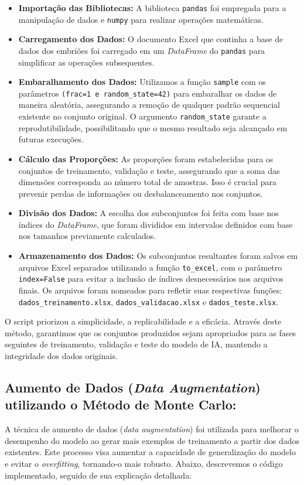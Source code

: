 \begin{itemize}
  \item \textbf{Importação das Bibliotecas:} A biblioteca \texttt{pandas} foi empregada para a manipulação de dados e \texttt{numpy} para realizar operações matemáticas.

  \item \textbf{Carregamento dos Dados:} O documento Excel que continha a base de dados dos embriões foi carregado em um \textit{DataFrame} do \texttt{pandas} para simplificar as operações subsequentes.

  \item \textbf{Embaralhamento dos Dados:} Utilizamos a função \texttt{sample} com os parâmetros \texttt{(frac=1 e random\_state=42)} para embaralhar os dados de maneira aleatória, assegurando a remoção de qualquer padrão sequencial existente no conjunto original. O argumento \texttt{random\_state} garante a reprodutibilidade, possibilitando que o mesmo resultado seja alcançado em futuras execuções.

  \item \textbf{Cálculo das Proporções:} As proporções foram estabelecidas para os conjuntos de treinamento, validação e teste, assegurando que a soma das dimensões corresponda ao número total de amostras. Isso é crucial para prevenir perdas de informações ou desbalanceamento nos conjuntos.

  \item \textbf{Divisão dos Dados:} A escolha dos subconjuntos foi feita com base nos índices do \textit{DataFrame}, que foram divididos em intervalos definidos com base nos tamanhos previamente calculados.

  \item \textbf{Armazenamento dos Dados:} Os subconjuntos resultantes foram salvos em arquivos Excel separados utilizando a função \texttt{to\_excel}, com o parâmetro \texttt{index=False} para evitar a inclusão de índices desnecessários nos arquivos finais. Os arquivos foram nomeados para refletir suas respectivas funções: \texttt{dados\_treinamento.xlsx}, \texttt{dados\_validacao.xlsx} e \texttt{dados\_teste.xlsx}. 
\end{itemize}

O script priorizou a simplicidade, a replicabilidade e a eficácia. Através deste método, garantimos que os conjuntos produzidos sejam apropriados para as fases seguintes de treinamento, validação e teste do modelo de IA, mantendo a integridade dos dados originais.

\subsection*{Aumento de Dados (\textit{Data Augmentation}) utilizando o Método de Monte Carlo:} 
A técnica de aumento de dados (\textit{data augmentation}) foi utilizada para melhorar o desempenho do modelo ao gerar mais exemplos de treinamento a partir dos dados existentes. Este processo visa aumentar a capacidade de generalização do modelo e evitar o \textit{overfitting}, tornando-o mais robusto. Abaixo, descrevemos o código implementado, seguido de sua explicação detalhada:

